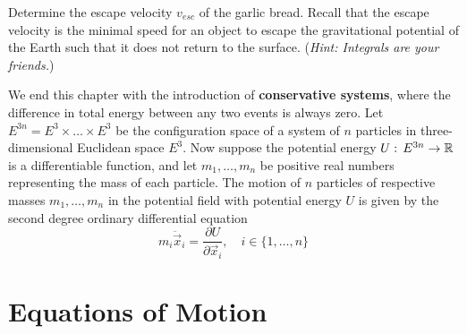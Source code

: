\documentclass{article}
\begin{document}
		\begin{exe}
			Determine the escape velocity $v_{esc}$ of the garlic bread. Recall that the escape velocity is the minimal speed for an object to escape the gravitational potential of the Earth such that it does not return to the surface. (\textit{Hint: Integrals are your friends.})
		\end{exe}
		We end this chapter with the introduction of \textbf{conservative systems}, where the difference in total energy between any two events is always zero. Let $E^{3n} = E^3 \times \dots \times E^3$ be the configuration space of a system of $n$ particles in three-dimensional Euclidean space $E^3$. Now suppose the potential energy $U: \, E^{3n} \to \mathbb{R}$ is a differentiable function, and let $m_1, \dots, m_n$ be positive real numbers representing the mass of each particle. The motion of $n$ particles of respective masses $m_1, \dots, m_n$ in the potential field with potential energy $U$ is given by the second degree ordinary differential equation
		\begin{equation}
			\label{eq:MotionMass}
			\boxed{m_i \ddot{\vec{x}}_i = \frac{\partial U}{\partial \vec{x}_i}, \quad i \in \{1, \dots, n\}}
		\end{equation}
		\newpage
		
		\section{Equations of Motion}
\end{document}
